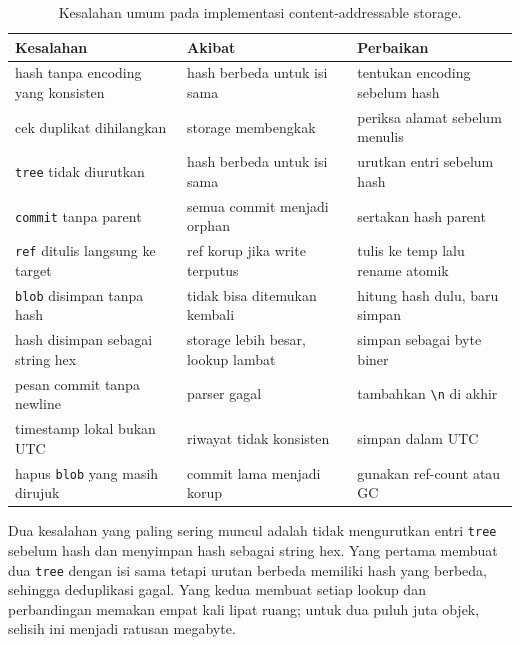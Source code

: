 \documentclass[11pt,a4paper]{article}
\begin{document}
\begin{table}[H]
	\centering
	\caption{Kesalahan umum pada implementasi content-addressable storage.}
	\label{tab:mistakes}
	\footnotesize
	\begin{tabularx}{\textwidth}{l X X}
		\toprule
		Kesalahan                               & Akibat                             & Perbaikan                                    \\
		\midrule
		hash tanpa encoding yang konsisten      & hash berbeda untuk isi sama        & tentukan encoding sebelum hash               \\
		cek duplikat dihilangkan                & storage membengkak                 & periksa alamat sebelum menulis               \\
		\texttt{tree} tidak diurutkan           & hash berbeda untuk isi sama        & urutkan entri sebelum hash                   \\
		\texttt{commit} tanpa parent            & semua commit menjadi orphan        & sertakan hash parent                         \\
		\texttt{ref} ditulis langsung ke target & ref korup jika write terputus      & tulis ke temp lalu rename atomik             \\
		\texttt{blob} disimpan tanpa hash       & tidak bisa ditemukan kembali       & hitung hash dulu, baru simpan                \\
		hash disimpan sebagai string hex        & storage lebih besar, lookup lambat & simpan sebagai byte biner                    \\
		pesan commit tanpa newline              & parser gagal                       & tambahkan \texttt{\textbackslash n} di akhir \\
		timestamp lokal bukan UTC               & riwayat tidak konsisten            & simpan dalam UTC                             \\
		hapus \texttt{blob} yang masih dirujuk  & commit lama menjadi korup          & gunakan ref-count atau GC                    \\
		\bottomrule
	\end{tabularx}
\end{table}

Dua kesalahan yang paling sering muncul adalah tidak mengurutkan entri \texttt{tree} sebelum hash dan menyimpan hash sebagai string hex. Yang pertama membuat dua \texttt{tree} dengan isi sama tetapi urutan berbeda memiliki hash yang berbeda, sehingga deduplikasi gagal. Yang kedua membuat setiap lookup dan perbandingan memakan empat kali lipat ruang; untuk dua puluh juta objek, selisih ini menjadi ratusan megabyte.
\end{document}
